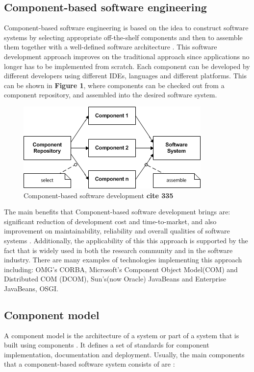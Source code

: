 \subsection{Component-based software engineering}

Component-based software engineering is based on the idea to construct software systems by selecting appropriate off-the-shelf components and then to assemble them together with a well-defined software architecture \cite{Pour}. This software development approach improves on the traditional approach since applications no longer has to be implemented from scratch. Each component can be developed by different developers using different IDEs, languages and different platforms. This can be shown in \textbf{Figure 1}, where components can be checked out from a component repository, and assembled into the desired software system.

\begin{figure}[h!]
  \centering
  	\includegraphics[scale=0.75]{plug-in/component-based.png}
  \caption{Component-based software development \textbf{cite 335} }
\end{figure}

The main benefits that Component-based software development brings are: significant reduction of development cost and time-to-market, and also improvement on maintainability, reliability and overall qualities of software systems \cite{Pour1} \cite{Pour2}. Additionally, the applicability of this this approach is supported by the fact that is widely used in both the research community and in the software industry. There are many examples of technologies implementing this approach including: OMG's CORBA,  Microsoft's Component Object Model(COM) and Distributed COM (DCOM), Sun's(now Oracle) JavaBeans and Enterprise JavaBeans, OSGI.

\subsection{Component model}

A component model is the architecture of a system or part of a system that is built using components \cite{Cai}. It defines a set of  standards for component implementation, documentation and deployment. Usually, the main components that a component-based software system consists of are \cite{Chen}:

